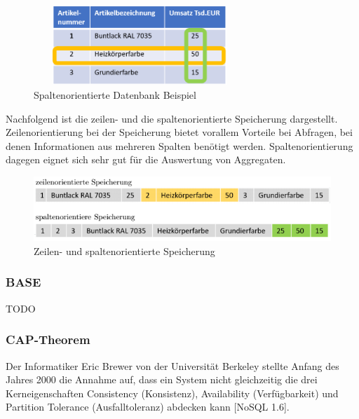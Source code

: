\begin{figure}[h]
\centering
\includegraphics[width=8cm, height = 3cm]{images/SpaltenorientiereDatenbank.png}
\caption{Spaltenorientierte Datenbank Beispiel \cite{DB1.5]}}
\end{figure}

Nachfolgend ist die zeilen- und die spaltenorientierte Speicherung dargestellt. Zeilenorientierung bei der Speicherung bietet vorallem Vorteile bei Abfragen, bei denen Informationen aus mehreren Spalten benötigt werden.
Spaltenorientierung dagegen eignet sich sehr gut für die Auswertung von Aggregaten.
\newline



\begin{figure}[htb]
\centering
\includegraphics[width=15cm]{images/zeilenspaltenorientiert.png}
\caption{Zeilen- und spaltenorientierte Speicherung \protect \footnotemark }
\end{figure}




\subsubsection{BASE}
TODO
\newline

\subsubsection{CAP-Theorem}
Der Informatiker Eric Brewer von der Universität Berkeley stellte Anfang des Jahres 2000 die Annahme auf, dass ein System nicht gleichzeitig die drei Kerneigenschaften Consistency (Konsistenz), Availability (Verfügbarkeit) und Partition Tolerance (Ausfalltoleranz) abdecken kann [NoSQL 1.6]. 
\newline

